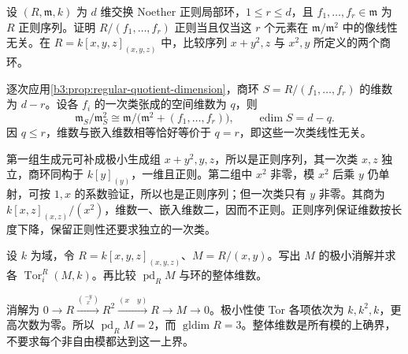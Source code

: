 \begin{exercise}\label{b3:ex:18-regular-hypersurface-criterion}
	设 \((R,\mathfrak m,k)\) 为 \(d\) 维交换 Noether 正则局部环，\(1\le r\le d\)，且 \(f_1,\ldots,f_r\in\mathfrak m\) 为 \(R\) 正则序列。证明 \(R/(f_1,\ldots,f_r)\) 正则当且仅当这 \(r\) 个元素在 \(\mathfrak m/\mathfrak m^2\) 中的像线性无关。在 \(R=k[x,y,z]_{(x,y,z)}\) 中，比较序列 \(x+y^2,z\) 与 \(x^2,y\) 所定义的两个商环。
\end{exercise}
\begin{solution}
	逐次应用\cref{b3:prop:regular-quotient-dimension}，商环 \(S=R/(f_1,\ldots,f_r)\) 的维数为 \(d-r\)。设各 \(f_i\) 的一次类张成的空间维数为 \(q\)，则
	\[
		\mathfrak m_S/\mathfrak m_S^2 \cong\mathfrak m/\bigl(\mathfrak m^2+(f_1,\ldots,f_r)\bigr), \qquad \operatorname{edim}S=d-q.
	\]
	因 \(q\le r\)，维数与嵌入维数相等恰好等价于 \(q=r\)，即这些一次类线性无关。

	第一组生成元可补成极小生成组 \(x+y^2,y,z\)，所以是正则序列，其一次类 \(x,z\) 独立，商环同构于 \(k[y]_{(y)}\)，一维且正则。第二组中 \(x^2\) 非零，模 \(x^2\) 后乘 \(y\) 仍单射，可按 \(1,x\) 的系数验证，所以也是正则序列；但一次类只有 \(y\) 非零。其商为 \(k[x,z]_{(x,z)}/(x^2)\)，维数一、嵌入维数二，因而不正则。正则序列保证维数按长度下降，保留正则性还要求独立的一次类。
\end{solution}

\begin{exercise}\label{b3:ex:18-koszul-globaldim-three}
	设 \(k\) 为域，令 \(R=k[x,y,z]_{(x,y,z)}\)、\(M=R/(x,y)\)。写出 \(M\) 的极小消解并求各 \(\operatorname{Tor}_i^R(M,k)\)。再比较 \(\operatorname{pd}_RM\) 与环的整体维数。
\end{exercise}
\begin{solution}
	消解为 \(0\to R\xrightarrow{\binom{-y}{x}}R^2\xrightarrow{(x\quad y)}R\to M\to0\)。极小性使 Tor 各项依次为 \(k,k^2,k\)，更高次数为零。所以 \(\operatorname{pd}_RM=2\)，而 \(\operatorname{gldim}R=3\)。整体维数是所有模的上确界，不要求每个非自由模都达到这一上界。
\end{solution}

